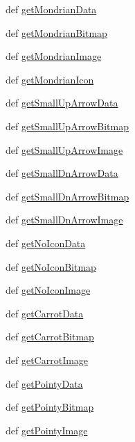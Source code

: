 \begin{DoxyCompactItemize}
\item 
def \hyperlink{namespaceimages_a17bd4e134e1bfe7cfe5fc51f3de2284b}{getMondrianData}
\item 
def \hyperlink{namespaceimages_adaf569a2665c7c3339e543a858ef2931}{getMondrianBitmap}
\item 
def \hyperlink{namespaceimages_a3da2099387a8c4409d14f2cc2712327a}{getMondrianImage}
\item 
def \hyperlink{namespaceimages_ad93acc3f938986acd283654fe802ed91}{getMondrianIcon}
\item 
def \hyperlink{namespaceimages_a6f26efd917df20c19470213f931a7cde}{getSmallUpArrowData}
\item 
def \hyperlink{namespaceimages_ae7f8363cb2e4954c45ede28fc86d8c06}{getSmallUpArrowBitmap}
\item 
def \hyperlink{namespaceimages_ab3db4dd38c4c2cf9b9ad805509bf1701}{getSmallUpArrowImage}
\item 
def \hyperlink{namespaceimages_aca649a86237cac7dc1353c65ab10b785}{getSmallDnArrowData}
\item 
def \hyperlink{namespaceimages_a2c8eea3f0714b105612d7c7717d1b9e9}{getSmallDnArrowBitmap}
\item 
def \hyperlink{namespaceimages_a7bbb79a5baab6a3d25bf5bf74ab13e07}{getSmallDnArrowImage}
\item 
def \hyperlink{namespaceimages_a4e09de9b1992cddec08a5a335fc44c81}{getNoIconData}
\item 
def \hyperlink{namespaceimages_af988b4cc715973071d3fbac0012e32e2}{getNoIconBitmap}
\item 
def \hyperlink{namespaceimages_a3e16fbce9e5a068237066a5f3f7109eb}{getNoIconImage}
\item 
def \hyperlink{namespaceimages_aedc3647002720cac060bed8930d0fa98}{getCarrotData}
\item 
def \hyperlink{namespaceimages_a21763b23d7a07a8f68d362ab483d8e31}{getCarrotBitmap}
\item 
def \hyperlink{namespaceimages_ad07e89f1bd2086d79dc870f7bd442394}{getCarrotImage}
\item 
def \hyperlink{namespaceimages_a6653046ebbadde8dea28f38e51828a3a}{getPointyData}
\item 
def \hyperlink{namespaceimages_a56802044bb7c293a25f86af65b775b6f}{getPointyBitmap}
\item 
def \hyperlink{namespaceimages_a6a9948ea602015275e516fc54b6a8dc1}{getPointyImage}
\item 

\end{DoxyCompactItemize}
